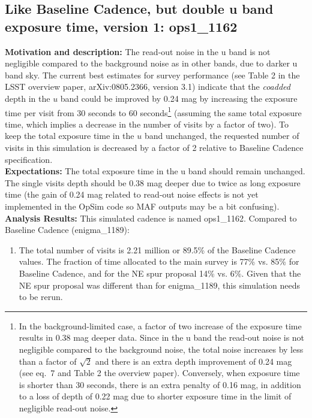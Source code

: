 \documentclass[manuscript]{article}
\begin{document}
\subsection{Like Baseline Cadence, but double u band exposure time, version 1: ops1\_1162 \label{sec:uband}} 


{\bf Motivation and description:} The read-out noise in the u band is not negligible
compared to the background noise as in other bands, due to darker u band sky. 
The current best estimates for survey performance (see Table 2 in the LSST overview paper, 
arXiv:0805.2366, version 3.1) indicate that the {\it coadded} depth in the $u$ band could be 
improved by 0.24 mag by increasing the exposure time per visit from 30 seconds to 
60 seconds\footnote{In the background-limited case, a factor of two increase of 
the exposure time results in 0.38 mag deeper data. Since in the u band the read-out noise 
is not negligible compared to the background noise, the total noise increases by less than
a factor of $\sqrt{2}$ and there is an extra depth improvement of 0.24 mag (see eq.~7 and
Table 2 the overview paper). Conversely, when exposure time is shorter than 30 seconds,
there is an extra penalty of 0.16 mag, in addition to a loss of depth of 0.22 mag due to shorter 
exposure time in the limit of negligible read-out noise.} 
(assuming the same total exposure time, which implies a decrease in the number of 
visits by a factor of two). To keep the total exposure time in the $u$ band 
unchanged, the requested number of visits in this simulation is decreased by a factor of 
2 relative to Baseline Cadence specification. \\

{\bf Expectations:} The total exposure time in the u band should remain unchanged.
The single visits depth should be 0.38 mag deeper due to twice as long exposure time 
(the gain of 0.24 mag related to read-out noise effects is not yet implemented in the
OpSim code so MAF outputs may be a bit confusing). \\

{\bf Analysis Results:} This simulated cadence is named ops1\_1162.  Compared
to Baseline Cadence (enigma\_1189):
\begin{enumerate}
\item The total number of visits is 2.21 million or 89.5\% of the Baseline Cadence
values. The fraction of time allocated to the main survey is 77\% vs. 85\% for Baseline
Cadence, and for the NE spur proposal 14\% vs. 6\%. Given that the NE spur proposal
was different than for enigma\_1189, this simulation needs to be rerun. 
\end{enumerate}
\end{document}
